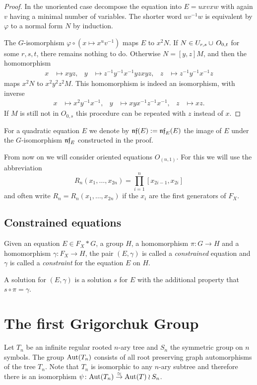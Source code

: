 \documentclass[a4paper,11pt]{amsart}
\begin{document}
\begin{proof}
  In the unoriented case decompose the equation into $E = uxvxw$ with
  again $v$ having a minimal number of variables.  The shorter word
  $uv^{-1}w$ is equivalent by $\varphi$ to a normal form $N$ by
  induction.
 
  The $G$-isomorphism $\varphi \circ (x\mapsto x^uv^{-1})$ maps $E$ to
  $x^2N$. If $N\in U_{r,s}\cup\thinspace O_{0,t}$ for some $r,s,t$,
  there remains nothing to do.  Otherwise $N=[y,z]M$, and then the
  homomorphism
  \begin{align*}
    x&\mapsto xyz, & y&\mapsto z^{-1}y^{-1}x^{-1}yzxyz, & z&\mapsto z^{-1}y^{-1}x^{-1}z
  \end{align*}
  maps $x^2N$ to $x^2y^2z^2M$. This homomorphism is indeed an
  isomorphism, with inverse
  \begin{align*}
    x&\mapsto x^2y^{-1}x^{-1}, & y&\mapsto xyx^{-1}z^{-1}x^{-1}, & z&\mapsto xz.
  \end{align*}
  If $M$ is still not in $O_{0,s}$ this procedure can be repeated with
  $z$ instead of $x$.
\end{proof}
For a quadratic equation $E$ we denote by $\mathfrak{nf}(E) := \mathfrak{nf}_E(E)$
the image of $E$ under the $G$-isomorphism $\mathfrak{nf}_E$ constructed in
the proof.

From now on we will consider oriented equations $O_{(n,1)}$. For this
we will use the abbreviation
\[R_n(x_1,\ldots,x_{2n})=\prod_{i=1}^n [x_{2i-1},x_{2i}]\]
and often write $R_n=R_n(x_1,\ldots,x_{2n})$ if the $x_i$ are the
first generators of $F_X$.

\subsection{Constrained equations}
\begin{defi}
  Given an equation $E \in F_X*G$, a group $H$, a homomorphism
  $\pi\colon G \to H$ and a homomorphism $\gamma\colon F_X \to H$, the
  pair $(E,\gamma)$ is called a \emph{constrained} equation and
  $\gamma$ is called a \emph{constraint} for the equation $E$ on $H$.
 
  A solution for $(E,\gamma)$ is a solution $s$ for $E$ with the
  additional property that $s\circ\pi=\gamma$.
\end{defi}

\section{The first Grigorchuk Group}
Let $T_n$ be an infinite regular rooted $n$-ary tree and $S_n$ the symmetric group on $n$ symbols.
The group $\textup{Aut}(T_n)$ consists of all root preserving graph automorphisms of the tree $T_n$. 
Note that $T_n$ is isomorphic to any $n$-ary subtree and therefore there is an isomorphism
$\psi\colon \textup{Aut}(T_n)\stackrel{\simeq}{\to} \textup{Aut}(T)\wr S_n$. 
\end{document}
